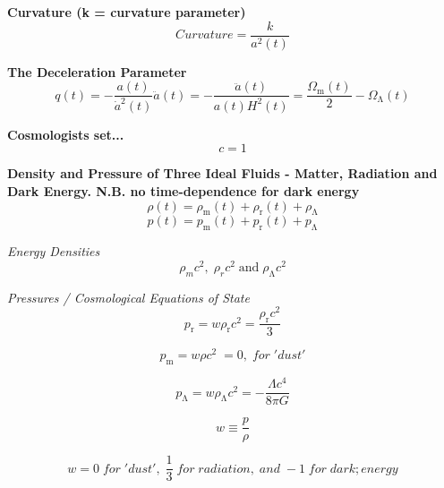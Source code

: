 \documentclass{article}
\begin{document}
\textbf {Curvature (k = curvature parameter)}
\begin{equation}
Curvature = \frac {k}{a^2(t)}
\end{equation}

\textbf {The Deceleration Parameter}
\begin{equation}
q(t) = - \frac {a(t)}{\dot{a}^2(t)} \ddot{a}(t) = - \frac {\ddot{a}(t)}{a(t) H^2(t)} = \frac {\Omega_\mathrm{m}(t)}{2} - \Omega_\mathrm{\Lambda}(t)
\end{equation}

\textbf {Cosmologists set...}
\begin{equation}
c = 1
\end{equation}

\textbf {Density and Pressure of Three Ideal Fluids - Matter, Radiation and Dark Energy. N.B. no time-dependence for dark energy}
\begin{equation}
\rho(t) = \rho_\mathrm{m}(t) +  \rho_\mathrm{r}(t) + \rho_\mathrm{\Lambda}
\end{equation}
\begin{equation}
p(t) = p_\mathrm{m}(t) + p_\mathrm{r}(t) + p_\mathrm{\Lambda}
\end{equation}

\textit {Energy Densities}
\begin{equation}
\rho_m c^2 \mathrm{,} \; \rho_r c^2 \; \mathrm{and} \; \rho_\mathrm{\Lambda} c^2
\end{equation}

\textit {Pressures / Cosmological Equations of State}
\begin{equation}
p_\mathrm{r} = w \rho_\mathrm{r} c^2 = \frac {\rho_\mathrm{r} c^2}{3}
\end{equation}

\begin{equation}
p_\mathrm{m} = w \rho c^2 \; = 0, \; for \; 'dust'
\end{equation}

\begin{equation}
p_\mathrm{\Lambda} = w \rho_\mathrm{\Lambda}c^2 = - \frac {\Lambda c^4}{8 \pi G}
\end{equation}

\begin{equation}
w \equiv \frac {p}{\rho}
\end{equation}

\begin{equation}
w = 0 \; for \; 'dust', \; \frac {1}{3} \; for \; radiation, \; and \; -1 \; for \; dark ; energy
\end{equation}
\end{document}
